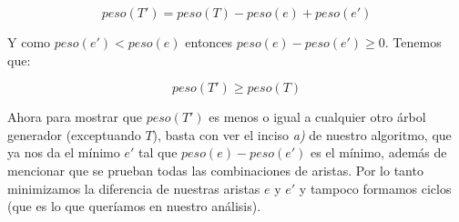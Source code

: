 \documentclass[11pt,letterpaper]{article}
\begin{document}
\begin{enumerate}[leftmargin=*]
    \begin{equation*}
      peso(T') = peso(T) - peso(e) + peso(e')
    \end{equation*}

    Y como $peso(e') < peso(e)$ entonces $peso(e) - peso(e') \geq 0$. Tenemos que:

    \begin{equation*}
      peso(T') \geq peso(T)
    \end{equation*}

    Ahora para mostrar que $peso(T')$ es menos o igual a cualquier otro árbol generador (exceptuando $T$), basta con ver el inciso \textit{a)} de nuestro algoritmo, que ya nos da el mínimo $e'$ tal que $peso(e) - peso(e')$ es el mínimo, además de mencionar que se prueban todas las combinaciones de aristas.
    Por lo tanto minimizamos la diferencia de nuestras aristas $e$ y $e'$ y tampoco formamos ciclos (que es lo que queríamos en nuestro análisis).
  \end{enumerate}
\end{document}
